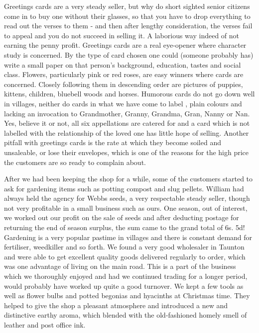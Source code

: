 Greetings cards are a very steady seller, but why do short sighted senior citizens come in to buy one without their glasses, so that you have to drop everything to read out the verses to them - and then after lengthy consideration, the verses fail to appeal and you do not succeed in selling it. A laborious way indeed of not earning the penny profit. Greetings cards are a real eye-opener where character study is concerned. By the type of card chosen one could (someone probably has) write a small paper on that person's background, education, tastes and social class. Flowers, particularly pink or red roses, are easy winners where cards are concerned. Closely following them in descending order are pictures of puppies, kittens, children, bluebell woods and horses. Humorous cards do not go down well in villages, neither do cards in what we have come to label , plain colours and lacking an invocation to Grandmother, Granny, Grandma, Gran, Nanny or Nan. Yes, believe it or not, all six appellations are catered for and a card which is not labelled with the relationship of the loved one has little hope of selling. Another pitfall with greetings cards is the rate at which they become soiled and unsaleable, or lose their envelopes, which is one of the reasons for the high price the customers are so ready to complain about.

After we had been keeping the shop for a while, some of the customers started to ask for gardening items such as potting compost and slug pellets. William had always held the agency for Webbs seeds, a very respectable steady seller, though not very profitable in a small business such as ours. One season, out of interest, we worked out our profit on the sale of seeds and after deducting postage for returning the end of season surplus, the sum came to the grand total of 6s. 5d! Gardening is a very popular pastime in villages and there is constant demand for fertiliser, weedkiller and so forth. We found a very good wholesaler in Taunton and were able to get excellent quality goods delivered regularly to order, which was one advantage of living on the main road. This is a part of the business which we thoroughly enjoyed and had we continued trading for a longer period, would probably have worked up quite a good turnover. We kept a few tools as well as flower bulbs and potted begonias and hyacinths at Christmas time. They helped to give the shop a pleasant atmosphere and introduced a new and distinctive earthy aroma, which blended with the old-fashioned homely smell of leather and post office ink.

